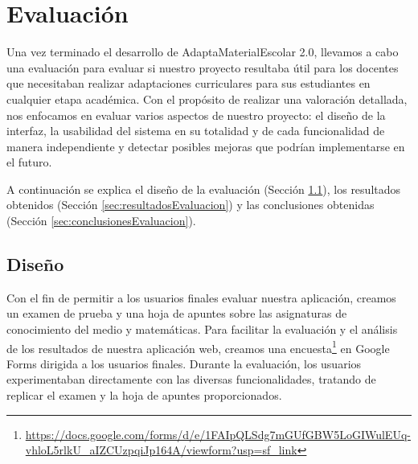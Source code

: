 \chapter{Evaluación}
\label{cap:evaluacion}
Una vez terminado el desarrollo de AdaptaMaterialEscolar 2.0, llevamos a cabo una evaluación para evaluar si nuestro proyecto resultaba útil para los docentes que necesitaban realizar adaptaciones curriculares para sus estudiantes en cualquier etapa académica. Con el propósito de realizar una valoración detallada, nos enfocamos en evaluar varios aspectos de nuestro proyecto: el diseño de la interfaz, la usabilidad del sistema en su totalidad y de cada funcionalidad de manera independiente y detectar posibles mejoras que podrían implementarse en el futuro.

A continuación se explica el diseño de la evaluación (Sección \ref{sec:disenyoEvaluacion}), los resultados obtenidos  (Sección \ref{sec:resultadosEvaluacion}) y las conclusiones obtenidas (Sección \ref{sec:conclusionesEvaluacion}).

\section{Diseño}\label{sec:disenyoEvaluacion}
Con el fin de permitir a los usuarios finales evaluar nuestra aplicación, creamos un examen de prueba y una hoja de apuntes sobre las asignaturas de conocimiento del medio y matemáticas.
Para facilitar la evaluación y el análisis de los resultados de nuestra aplicación web, creamos una encuesta\footnote{\url{https://docs.google.com/forms/d/e/1FAIpQLSdg7mGUfGBW5LoGIWulEUq-vhloL5rlkU_aIZCUzpqiJp164A/viewform?usp=sf_link}} en Google Forms dirigida a los usuarios finales. Durante la evaluación, los usuarios experimentaban directamente con las diversas funcionalidades, tratando de replicar el examen y la hoja de apuntes proporcionados.

